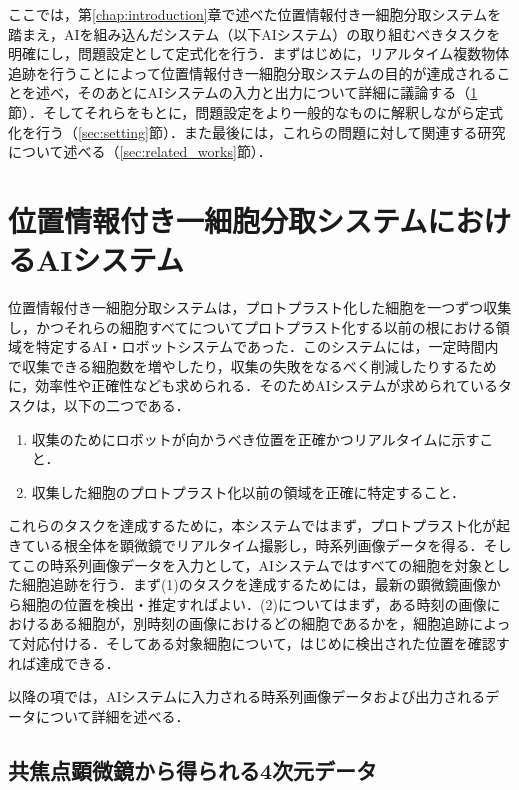 \thispagestyle{fancy2}

ここでは，第\ref{chap:introduction}章で述べた位置情報付き一細胞分取システムを踏まえ，AIを組み込んだシステム（以下AIシステム）の取り組むべきタスクを明確にし，問題設定として定式化を行う．まずはじめに，リアルタイム複数物体追跡を行うことによって位置情報付き一細胞分取システムの目的が達成されることを述べ，そのあとにAIシステムの入力と出力について詳細に議論する（\ref{sec:ai_system}節）．そしてそれらをもとに，問題設定をより一般的なものに解釈しながら定式化を行う（\ref{sec:setting}節）．また最後には，これらの問題に対して関連する研究について述べる（\ref{sec:related_works}節）．

\section{位置情報付き一細胞分取システムにおけるAIシステム}

\label{sec:ai_system}
位置情報付き一細胞分取システムは，プロトプラスト化した細胞を一つずつ収集し，かつそれらの細胞すべてについてプロトプラスト化する以前の根における領域を特定するAI・ロボットシステムであった．このシステムには，一定時間内で収集できる細胞数を増やしたり，収集の失敗をなるべく削減したりするために，効率性や正確性なども求められる．そのためAIシステムが求められているタスクは，以下の二つである．
\begin{enumerate}[label=(\arabic*)]
    \item 収集のためにロボットが向かうべき位置を正確かつリアルタイムに示すこと．
    \item 収集した細胞のプロトプラスト化以前の領域を正確に特定すること．
\end{enumerate}

これらのタスクを達成するために，本システムではまず，プロトプラスト化が起きている根全体を顕微鏡でリアルタイム撮影し，時系列画像データを得る．そしてこの時系列画像データを入力として，AIシステムではすべての細胞を対象とした細胞追跡を行う．まず(1)のタスクを達成するためには，最新の顕微鏡画像から細胞の位置を検出・推定すればよい．(2)についてはまず，ある時刻の画像におけるある細胞が，別時刻の画像におけるどの細胞であるかを，細胞追跡によって対応付ける．そしてある対象細胞について，はじめに検出された位置を確認すれば達成できる．

以降の項では，AIシステムに入力される時系列画像データおよび出力されるデータについて詳細を述べる．

    \subsection{共焦点顕微鏡から得られる4次元データ}
    \label{subsec:input_from_confocal_microscope}

